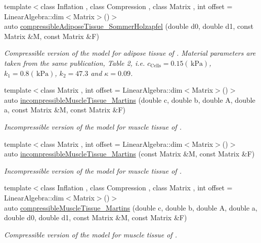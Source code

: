 \begin{DoxyCompactItemize}
{\footnotesize template$<$class Inflation , class Compression , class Matrix , int offset = Linear\+Algebra\+::dim$<$\+Matrix$>$()$>$ }\\auto \hyperlink{group__Biomechanics_ga27bb3f7c579ce8c21a69ea4d4d0169d7}{compressible\+Adipose\+Tissue\+\_\+\+Sommer\+Holzapfel} (double d0, double d1, const Matrix \&M, const Matrix \&F)
\begin{DoxyCompactList}\small\item\em Compressible version of the model for adipose tissue of \cite{Sommer2013}. Material parameters are taken from the same publication, Table 2, i.\+e. $c_\mathrm{Cells}=0.15 (\,\mathrm{kPa})$, $k_1=0.8 (\,\mathrm{kPa})$, $k_2=47.3$ and $\kappa=0.09$. \end{DoxyCompactList}\item 
{\footnotesize template$<$class Matrix , int offset = Linear\+Algebra\+::dim$<$\+Matrix$>$()$>$ }\\auto \hyperlink{group__Biomechanics_gafcc36a1958899ca9246c4c1b3c9bfd85}{incompressible\+Muscle\+Tissue\+\_\+\+Martins} (double c, double b, double A, double a, const Matrix \&M, const Matrix \&F)
\begin{DoxyCompactList}\small\item\em Incompressible version of the model for muscle tissue of \cite{Martins1998}. \end{DoxyCompactList}\item 
{\footnotesize template$<$class Matrix , int offset = Linear\+Algebra\+::dim$<$\+Matrix$>$()$>$ }\\auto \hyperlink{group__Biomechanics_ga9e414585a90b1988e9fa88d17d875055}{incompressible\+Muscle\+Tissue\+\_\+\+Martins} (const Matrix \&M, const Matrix \&F)
\begin{DoxyCompactList}\small\item\em Incompressible version of the model for muscle tissue of \cite{Martins1998}. \end{DoxyCompactList}\item 
{\footnotesize template$<$class Inflation , class Compression , class Matrix , int offset = Linear\+Algebra\+::dim$<$\+Matrix$>$()$>$ }\\auto \hyperlink{group__Biomechanics_gad831914c493a3da04ed40c3c0ce87a62}{compressible\+Muscle\+Tissue\+\_\+\+Martins} (double c, double b, double A, double a, double d0, double d1, const Matrix \&M, const Matrix \&F)
\begin{DoxyCompactList}\small\item\em Compressible version of the model for muscle tissue of \cite{Martins1998}. \end{DoxyCompactList}\item 

\end{DoxyCompactItemize}
